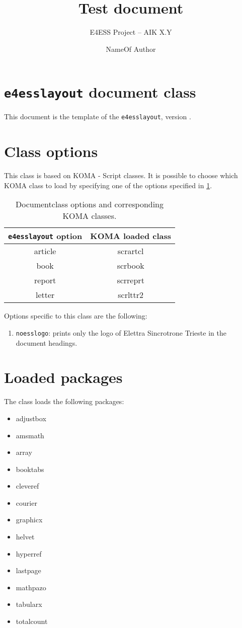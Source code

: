 \documentclass[a4paper,article]{e4esslayout}
\title{%
	Test document
}
\subtitle{%
	E4ESS Project -- AIK X.Y
}
\author{%
	NameOf Author
}
\begin{document}



\section{\texttt{e4esslayout} document class}
\label{sec:declaration}
This document is the template of the \texttt{e4esslayout}, version .

\section{Class options}
\label{sec:cla-opt}
This class is based on \textsf{KOMA - Script} classes.
It is possible to choose which \textsf{KOMA} class to load by specifying one of the options specified in \cref{tab:doc-opt}.
\begin{table}[b]
	\centering
	\caption{Documentclass options and corresponding \textsf{KOMA} classes.}
	\label{tab:doc-opt}
	\begin{tabular}{cc}
	\toprule
	\texttt{e4esslayout} option & \textsf{KOMA} loaded class \\
	\toprule
	article & scrartcl \\
	book    & scrbook \\
	report  & scrreprt \\
	letter  & scrlttr2 \\
	\bottomrule
	\end{tabular}
\end{table}

Options specific to this class are the following:
\begin{enumerate}
	\item \texttt{noesslogo}: prints only the logo of Elettra Sincrotrone Trieste in the document headings.
\end{enumerate}

\section{Loaded packages}
\label{sec:loa-pac}
The class loads the following packages:
\begin{itemize}
	\item adjustbox
	\item amsmath
	\item array
	\item booktabs
	\item cleveref
	\item courier
	\item graphicx
	\item helvet
	\item hyperref
	\item lastpage
	\item mathpazo
	\item tabularx
	\item totalcount
\end{itemize}
\end{document}
